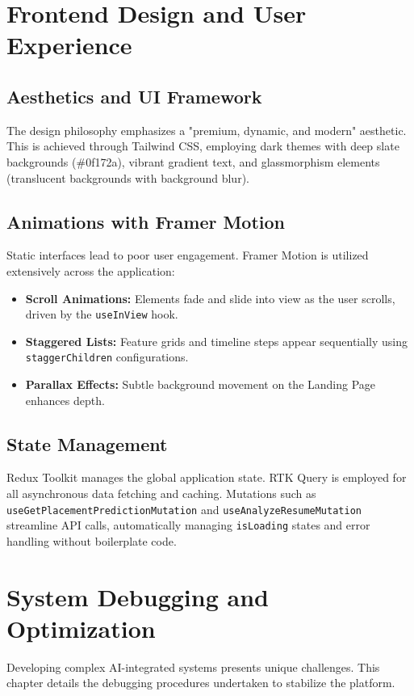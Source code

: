 \documentclass[12pt,a4paper]{report}
\begin{document}
\chapter{Frontend Design and User Experience}
\section{Aesthetics and UI Framework}
The design philosophy emphasizes a "premium, dynamic, and modern" aesthetic. This is achieved through Tailwind CSS, employing dark themes with deep slate backgrounds (\#0f172a), vibrant gradient text, and glassmorphism elements (translucent backgrounds with background blur).

\section{Animations with Framer Motion}
Static interfaces lead to poor user engagement. Framer Motion is utilized extensively across the application:
\begin{itemize}
    \item \textbf{Scroll Animations:} Elements fade and slide into view as the user scrolls, driven by the \texttt{useInView} hook.
    \item \textbf{Staggered Lists:} Feature grids and timeline steps appear sequentially using \texttt{staggerChildren} configurations.
    \item \textbf{Parallax Effects:} Subtle background movement on the Landing Page enhances depth.
\end{itemize}

\section{State Management}
Redux Toolkit manages the global application state. RTK Query is employed for all asynchronous data fetching and caching. Mutations such as \texttt{useGetPlacementPredictionMutation} and \texttt{useAnalyzeResumeMutation} streamline API calls, automatically managing \texttt{isLoading} states and error handling without boilerplate code.

\chapter{System Debugging and Optimization}
Developing complex AI-integrated systems presents unique challenges. This chapter details the debugging procedures undertaken to stabilize the platform.
\end{document}
